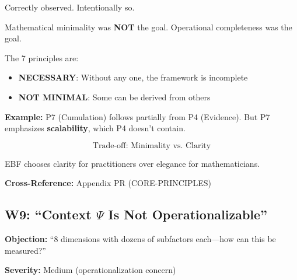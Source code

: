 \begin{axiom}
Correctly observed. Intentionally so.

Mathematical minimality was \textbf{NOT} the goal.
Operational completeness was the goal.

The 7 principles are:
\begin{itemize}[nosep]
    \item \textbf{NECESSARY}: Without any one, the framework is incomplete
    \item \textbf{NOT MINIMAL}: Some can be derived from others
\end{itemize}

\textbf{Example:} P7 (Cumulation) follows partially from P4 (Evidence).
But P7 emphasizes \textbf{scalability}, which P4 doesn't contain.

\begin{equation}
\text{Trade-off: Minimality vs. Clarity}
\end{equation}

EBF chooses clarity for practitioners over elegance for mathematicians.
\end{axiom}

\textbf{Cross-Reference:} Appendix PR (CORE-PRINCIPLES)

\subsection{W9: ``Context $\Psi$ Is Not Operationalizable''}
\label{sec:da-w9}

\begin{tcolorbox}[colback=gray!5!white, colframe=gray!75!black]
\textbf{Objection:} ``8 dimensions with dozens of subfactors each---how can this be measured?''

\textbf{Severity:} Medium (operationalization concern)
\end{tcolorbox}

